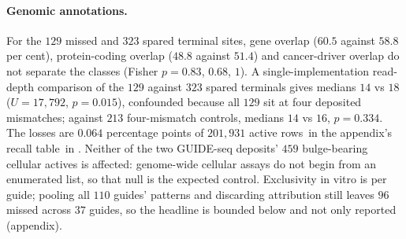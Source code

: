 \paragraph{Genomic annotations.}
For the $129$ missed and $323$ spared terminal sites, gene overlap ($60.5$ against $58.8$
per cent), protein-coding overlap ($48.8$ against $51.4$) and cancer-driver overlap do not
separate the classes (Fisher $p=0.83$, $0.68$, $1$). A single-implementation
read-depth comparison of the $129$ against $323$ spared terminals gives medians $14$ vs $18$
($U=17{,}792$, $p=0.015$), confounded because all $129$ sit at four deposited mismatches; against
$213$ four-mismatch controls, medians $14$ vs $16$, $p=0.334$. The losses are $0.064$ percentage points of
$201{,}931$ active rows\ifrecombmode\ in the appendix's recall table\else\ in \fi.
Neither of the two GUIDE-seq deposits' $459$ bulge-bearing cellular actives is affected:
genome-wide cellular assays do not begin from an enumerated list, so that null is the expected
control. Exclusivity in vitro is per guide; pooling all $110$ guides' patterns and discarding
attribution still leaves $96$ missed across $37$ guides, so the headline is bounded below and
not only reported (appendix).

